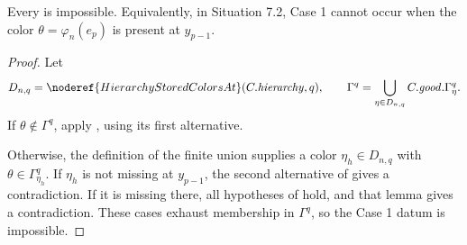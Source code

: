\begin{lemma}
Every  is impossible.
Equivalently, in Situation 7.2, Case 1 cannot occur when the color
\(\theta=\varphi_n(e_p)\) is present at \(y_{p-1}\).
\end{lemma}
\begin{proof}
Let
\[
 D_{n,q}=\noderef{HierarchyStoredColorsAt}(C.\mathit{hierarchy},q),
\qquad
 \Gamma^q=\bigcup_{\eta\in D_{n,q}}
   C.\mathit{good}.\Gamma^q_\eta .
\]
If \(\theta\notin\Gamma^q\), apply
, using its
first alternative.

Otherwise, the definition of the finite union supplies a color
\(\eta_h\in D_{n,q}\) with
\(\theta\in\Gamma^q_{\eta_h}\).  If \(\eta_h\) is not missing at
\(y_{p-1}\), the second alternative of
 gives a
contradiction.  If it is missing there, all hypotheses of
 hold, and
that lemma gives a contradiction.  These cases exhaust membership in
\(\Gamma^q\), so the Case 1 datum is impossible.
\end{proof}

